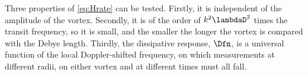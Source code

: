 Three properties of \cref{eq:Hrate} can be tested. Firstly, it is independent of the amplitude of the vortex. Secondly, it is of the order of \(k^2\lambdaD^2\) times the transit frequency, so it is small, and the smaller the longer the vortex is compared with the Debye length. Thirdly, the dissipative response, \(\Dfn\), is a universal function of the local Doppler-shifted frequency, on which measurements at different radii, on either vortex and at different times must all fall.

